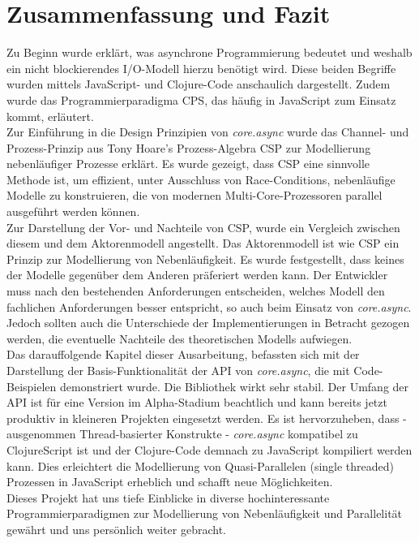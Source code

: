 \chapter{Zusammenfassung und Fazit}

Zu Beginn wurde erklärt, was asynchrone Programmierung bedeutet und weshalb ein nicht blockierendes \acs{I/O}-Modell hierzu benötigt wird. Diese beiden Begriffe wurden mittels JavaScript- und Clojure-Code anschaulich dargestellt. Zudem wurde das Programmierparadigma \acf{CPS}, das häufig in JavaScript zum Einsatz kommt, erläutert.\\
Zur Einführung in die Design Prinzipien von \textit{core.async} wurde das Channel- und Prozess-Prinzip aus Tony Hoare's Prozess-Algebra \acf{CSP} zur Modellierung nebenläufiger Prozesse erklärt. Es wurde gezeigt, dass \acs{CSP} eine sinnvolle Methode ist, um effizient, unter Ausschluss von  Race-Conditions, nebenläufige Modelle zu konstruieren, die von modernen Multi-Core-Prozessoren parallel ausgeführt werden können.\\
Zur Darstellung der Vor- und Nachteile von \acs{CSP}, wurde ein Vergleich zwischen diesem und dem Aktorenmodell angestellt. Das Aktorenmodell ist wie \acs{CSP} ein Prinzip zur Modellierung von Nebenläufigkeit. Es wurde festgestellt, dass keines der Modelle gegenüber dem Anderen präferiert werden kann. Der Entwickler muss nach den bestehenden Anforderungen entscheiden, welches Modell den fachlichen Anforderungen besser entspricht, so auch beim Einsatz von \textit{core.async}. Jedoch sollten auch die Unterschiede der Implementierungen in Betracht gezogen werden, die eventuelle Nachteile des theoretischen Modells aufwiegen.\\
Das darauffolgende Kapitel dieser Ausarbeitung, befassten sich mit der Darstellung der Basis-Funktionalität der \acs{API} von \textit{core.async}, die mit Code-Beispielen demonstriert wurde. Die Bibliothek wirkt sehr stabil. Der Umfang der \acs{API} ist für eine Version im Alpha-Stadium beachtlich und kann bereits jetzt produktiv in kleineren Projekten eingesetzt werden. Es ist hervorzuheben, dass - ausgenommen Thread-basierter Konstrukte - \textit{core.async} kompatibel zu ClojureScript ist und der Clojure-Code demnach zu JavaScript kompiliert werden kann. Dies erleichtert die Modellierung von Quasi-Parallelen (single threaded) Prozessen in JavaScript erheblich und schafft neue Möglichkeiten.\\
Dieses Projekt hat uns tiefe Einblicke in diverse hochinteressante Programmierparadigmen zur Modellierung von Nebenläufigkeit und Parallelität gewährt und uns persönlich weiter gebracht.



